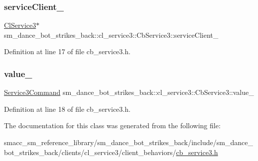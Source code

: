 \subsubsection{\texorpdfstring{service\+Client\+\_\+}{serviceClient\_}}
{\footnotesize\ttfamily \hyperlink{classsm__dance__bot__strikes__back_1_1cl__service3_1_1ClService3}{Cl\+Service3}$\ast$ sm\+\_\+dance\+\_\+bot\+\_\+strikes\+\_\+back\+::cl\+\_\+service3\+::\+Cb\+Service3\+::service\+Client\+\_\+\hspace{0.3cm}{\ttfamily [private]}}



Definition at line 17 of file cb\+\_\+service3.\+h.

\mbox{\label{classsm__dance__bot__strikes__back_1_1cl__service3_1_1CbService3_a76973df60e0e3ed7d7c270d0701b8f9d}} 
\subsubsection{\texorpdfstring{value\+\_\+}{value\_}}
{\footnotesize\ttfamily \hyperlink{namespacesm__dance__bot__strikes__back_1_1cl__service3_ac2ccf5d911840620cf8d0443c29d8b6b}{Service3\+Command} sm\+\_\+dance\+\_\+bot\+\_\+strikes\+\_\+back\+::cl\+\_\+service3\+::\+Cb\+Service3\+::value\+\_\+\hspace{0.3cm}{\ttfamily [private]}}



Definition at line 18 of file cb\+\_\+service3.\+h.



The documentation for this class was generated from the following file\+:\begin{DoxyCompactItemize}
\item 
smacc\+\_\+sm\+\_\+reference\+\_\+library/sm\+\_\+dance\+\_\+bot\+\_\+strikes\+\_\+back/include/sm\+\_\+dance\+\_\+bot\+\_\+strikes\+\_\+back/clients/cl\+\_\+service3/client\+\_\+behaviors/\hyperlink{strikes__back_2include_2sm__dance__bot__strikes__back_2clients_2cl__service3_2client__behaviors_2cb__service3_8h}{cb\+\_\+service3.\+h}\end{DoxyCompactItemize}
